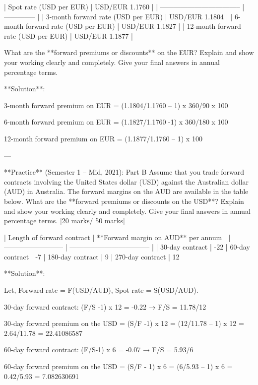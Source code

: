 | Spot rate (USD per EUR)             | USD/EUR 1.1760 |
| ----------------------------------- | -------------- |
| 3-month forward rate (USD per EUR)  | USD/EUR 1.1804 |
| 6-month forward rate (USD per EUR)  | USD/EUR 1.1827 |
| 12-month forward rate (USD per EUR) | USD/EUR 1.1877 |

What are the **forward premiums or discounts** on the EUR? Explain and show your working clearly and completely. Give your final answers in annual percentage terms.

**Solution**:

3-month forward premium on EUR = (1.1804/1.1760 – 1) x 360/90 x 100 %

6-month forward premium on EUR = (1.1827/1.1760 -1) x 360/180 x 100 %

12-month forward premium on EUR = (1.1877/1.1760 – 1) x 100%

---

**Practice** (Semester 1 -- Mid, 2021): Part B Assume that you trade forward contracts involving the United States dollar (USD) against the Australian dollar (AUD) in Australia. The forward margins on the AUD are available in the table below. What are the **forward premiums or discounts on the USD**? Explain and show your working clearly and completely. Give your final answers in annual percentage terms. [20 marks/ 50 marks]

| Length of forward contract | **Forward margin on AUD** per annum |
| -------------------------- | ----------------------------------- |
| 30-day contract            | -22%
| 60-day contract            | -7%
| 180-day contract           | 9%
| 270-day contract           | 12%

**Solution**:

Let, Forward rate = F(USD/AUD), Spot rate = S(USD/AUD).

30-day forward contract: (F/S -1) x 12 = -0.22 → F/S = 11.78/12

30-day forward premium on the USD = (S/F -1) x 12 = (12/11.78 – 1) x 12 = 2.64/11.78 = 22.41086587 %

60-day forward contract: (F/S-1) x 6 = -0.07 → F/S = 5.93/6

60-day forward premium on the USD = (S/F - 1) x 6 = (6/5.93 – 1) x 6 = 0.42/5.93 = 7.082630691 %

